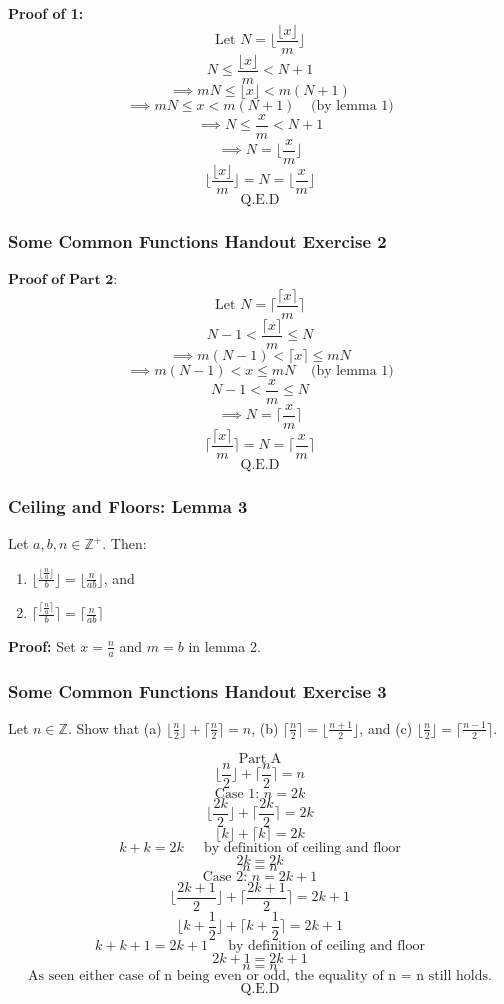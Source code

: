 \documentclass{article}
\begin{document}
\textbf{Proof of 1:}
$$\text{Let } N = \lfloor \frac{\lfloor x \rfloor}{m} \rfloor$$
$$N \le \frac{\lfloor x \rfloor}{m} < N + 1$$
$$\implies mN \le \lfloor x \rfloor < m(N + 1)$$
$$\implies mN \le x < m(N + 1)    \;\;\;\;\text{(by lemma 1)}$$
$$\implies N \le \frac{x}{m}< N + 1 $$
$$\implies N = \lfloor \frac{x}{m} \rfloor$$
$$\lfloor \frac{\lfloor x \rfloor}{m} \rfloor = N = \lfloor \frac{x}{m} \rfloor$$
$$\text{Q.E.D}$$

\subsubsection{Some Common Functions Handout Exercise 2}
$\textbf{Proof of Part 2:}$
$$\text{Let } N = \lceil \frac{\lceil x \rceil}{m} \rceil$$
$$N - 1 < \frac{\lceil x \rceil}{m} \le N$$
$$\implies m(N - 1) < \lceil x \rceil \le mN$$
$$\implies m(N - 1) < x  \le mN \;\;\;\;\text{(by lemma 1)} $$
$$N - 1 < \frac{ x }{m} \le N$$
$$\implies N = \lceil \frac{x}{m} \rceil$$
$$\lceil \frac{\lceil x \rceil}{m} \rceil = N = \lceil \frac{x}{m} \rceil$$
$$\text{Q.E.D}$$

\subsubsection{Ceiling and Floors: Lemma 3}
Let $a,b,n \in \mathbb{Z}^+$. Then:

\begin{enumerate}
    \item $\lfloor \frac{\lfloor \frac{n}{a} \rfloor}{b} \rfloor = \lfloor \frac{n}{ab} \rfloor$, and
    \item $\lceil \frac{\lceil \frac{n}{a} \rceil}{b} \rceil = \lceil \frac{n}{ab} \rceil$
\end{enumerate}

\textbf{Proof: } Set $x = \frac{n}{a}$ and $m = b$ in lemma 2.

\subsubsection{Some Common Functions Handout Exercise 3}
Let $n \in \mathbb{Z}$. Show that (a) $\lfloor \frac{n}{2} \rfloor + \lceil \frac{n}{2} \rceil = n$, (b) $\lceil \frac{n}{2} \rceil = \lfloor \frac{n + 1}{2} \rfloor$, and (c) $\lfloor \frac{n}{2} \rfloor = \lceil \frac{n - 1}{2} \rceil$.

$$\text{Part A}$$
$$\lfloor \frac{n}{2} \rfloor + \lceil \frac{n}{2} \rceil = n$$
$$\text{Case 1: } n = 2k$$
$$\lfloor \frac{2k}{2} \rfloor + \lceil \frac{2k}{2} \rceil = 2k$$
$$\lfloor k \rfloor + \lceil k \rceil = 2k$$
$$k + k = 2k  \;\;\;\; \text{ by definition of ceiling and floor}$$
$$2k = 2k $$
$$n = n$$
$$\text{Case 2: } n = 2k + 1$$
$$\lfloor \frac{2k + 1}{2} \rfloor + \lceil \frac{2k + 1}{2} \rceil = 2k + 1$$
$$\lfloor k + \frac{1}{2} \rfloor + \lceil k + \frac{1}{2} \rceil = 2k + 1$$
$$k + k + 1 = 2k + 1 \;\;\;\; \text{ by definition of ceiling and floor}$$
$$2k + 1 = 2k + 1$$
$$n = n$$
$$\text{As seen either case of n being even or odd, the equality of n = n still holds.}$$
$$\text{Q.E.D}$$
\end{document}
